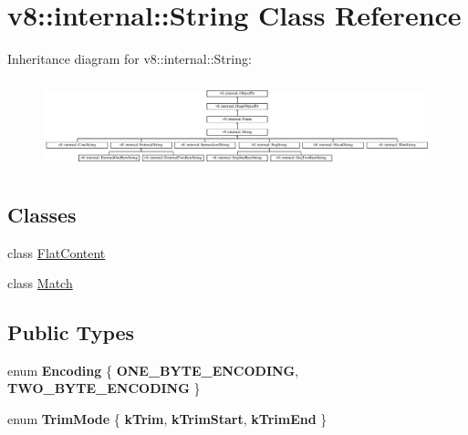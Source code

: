 \hypertarget{classv8_1_1internal_1_1String}{}\section{v8\+:\+:internal\+:\+:String Class Reference}
\label{classv8_1_1internal_1_1String}
Inheritance diagram for v8\+:\+:internal\+:\+:String\+:\begin{figure}[H]
\begin{center}
\leavevmode
\includegraphics[height=2.592592cm]{classv8_1_1internal_1_1String}
\end{center}
\end{figure}
\subsection*{Classes}
\begin{DoxyCompactItemize}
\item 
class \mbox{\hyperlink{classv8_1_1internal_1_1String_1_1FlatContent}{Flat\+Content}}
\item 
class \mbox{\hyperlink{classv8_1_1internal_1_1String_1_1Match}{Match}}
\end{DoxyCompactItemize}
\subsection*{Public Types}
\begin{DoxyCompactItemize}
\item 
\mbox{\label{classv8_1_1internal_1_1String_a538c62114120f52395d17c186574b6db}} 
enum {\bfseries Encoding} \{ {\bfseries O\+N\+E\+\_\+\+B\+Y\+T\+E\+\_\+\+E\+N\+C\+O\+D\+I\+NG}, 
{\bfseries T\+W\+O\+\_\+\+B\+Y\+T\+E\+\_\+\+E\+N\+C\+O\+D\+I\+NG}
 \}
\item 
\mbox{\label{classv8_1_1internal_1_1String_ae7dd8cd1e507f5ada0e0e4153b11feb0}} 
enum {\bfseries Trim\+Mode} \{ {\bfseries k\+Trim}, 
{\bfseries k\+Trim\+Start}, 
{\bfseries k\+Trim\+End}
 \}
\end{DoxyCompactItemize}
